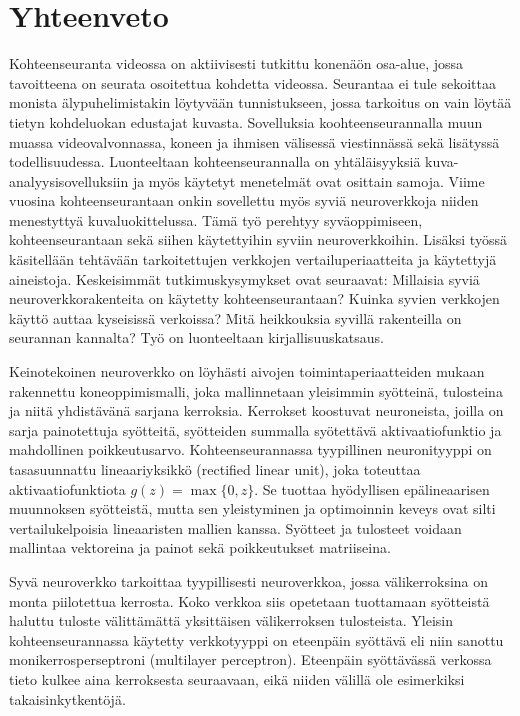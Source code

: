 \clearpage
\section*{Yhteenveto}
Kohteenseuranta videossa on aktiivisesti tutkittu konenäön osa-alue, jossa tavoitteena
on seurata osoitettua kohdetta videossa. Seurantaa ei tule sekoittaa monista älypuhelimistakin
löytyvään tunnistukseen, jossa tarkoitus on vain löytää tietyn kohdeluokan edustajat
kuvasta. Sovelluksia koohteenseurannalla muun muassa videovalvonnassa, koneen ja ihmisen
välisessä viestinnässä sekä lisätyssä todellisuudessa. Luonteeltaan kohteenseurannalla on
yhtäläisyyksiä kuva-analyysisovelluksiin ja myös käytetyt menetelmät ovat osittain samoja.
Viime vuosina kohteenseurantaan onkin sovellettu myös syviä neuroverkkoja niiden menestyttyä
kuvaluokittelussa. Tämä työ perehtyy syväoppimiseen, kohteenseurantaan sekä siihen
käytettyihin syviin neuroverkkoihin. Lisäksi työssä käsitellään tehtävään tarkoitettujen
verkkojen vertailuperiaatteita ja käytettyjä aineistoja. Keskeisimmät tutkimuskysymykset
ovat seuraavat: Millaisia syviä neuroverkkorakenteita on käytetty kohteenseurantaan? Kuinka
syvien verkkojen käyttö auttaa kyseisissä verkoissa? Mitä heikkouksia syvillä rakenteilla
on seurannan kannalta? Työ on luonteeltaan kirjallisuuskatsaus.

Keinotekoinen neuroverkko on löyhästi aivojen toimintaperiaatteiden mukaan rakennettu
koneoppimismalli, joka mallinnetaan yleisimmin syötteinä, tulosteina ja niitä yhdistävänä
sarjana kerroksia. Kerrokset koostuvat neuroneista, joilla on sarja painotettuja syötteitä,
syötteiden summalla syötettävä aktivaatiofunktio ja mahdollinen poikkeutusarvo. Kohteenseurannassa
tyypillinen neuronityyppi on tasasuunnattu lineaariyksikkö (rectified linear unit), joka
toteuttaa aktivaatiofunktiota $g (z) = \max\{0,z\}$. Se tuottaa hyödyllisen epälineaarisen
muunnoksen syötteistä, mutta sen yleistyminen ja optimoinnin keveys ovat silti vertailukelpoisia
lineaaristen mallien kanssa. Syötteet ja tulosteet voidaan mallintaa vektoreina ja painot sekä
poikkeutukset matriiseina.

Syvä neuroverkko tarkoittaa tyypillisesti neuroverkkoa, jossa välikerroksina on monta
piilotettua kerrosta. Koko verkkoa siis opetetaan tuottamaan syötteistä haluttu tuloste
välittämättä yksittäisen välikerroksen tulosteista. Yleisin kohteenseurannassa käytetty
verkkotyyppi on eteenpäin syöttävä eli niin sanottu monikerrosperseptroni (multilayer
perceptron). Eteenpäin syöttävässä verkossa tieto kulkee aina kerroksesta seuraavaan,
eikä niiden välillä ole esimerkiksi takaisinkytkentöjä.

